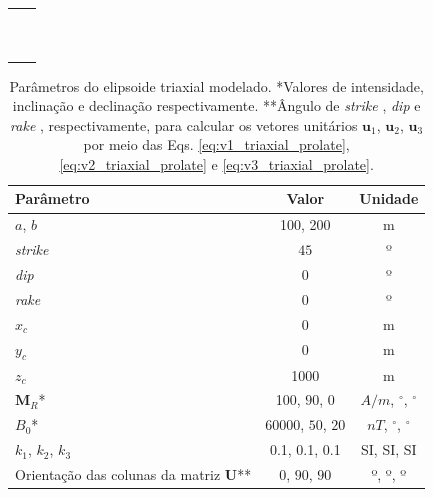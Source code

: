 \begin{table}[h!]
	\begin{center}
		\begin{tabular}{lc}
		
			 &  \\
			 & \\
			 & \\
			 & \\
			& \\
			& \\ 
			& \\
			& \\
			& \\ 
			& \\
\end{tabular}
\end{center}
\end{table}

\begin{table}[h!]
	\begin{center}
		\begin{tabular}{|l|c|c|}
			\hline
			\textbf{Parâmetro}  & \textbf{Valor} & \textbf{Unidade} \\
			\hline 
			$a$, $b$  & 100, 200 & m \\
			\hline
			\textit{strike}   & $45$ & º\\
			\hline
			\textit{dip}    & $0$ & º\\
			\hline
			\textit{rake}   & $0$  & º\\
			\hline
			$x_c $  & 0  & m\\
			\hline          
			$y_c$   & 0  & m\\
			\hline                
			$z_c$   & 1000  & m\\
			\hline
			$\mathbf{M}_{R}$*  & 100, $90$, $0$  & $A/m$, $^{\circ}$, $^{\circ}$\\
			\hline
			$B_0$*    & 60000, $50$, $20$ & $nT$, $^{\circ}$, $^{\circ}$\\
			\hline
			$k_{1}$, $k_{2}$, $k_{3}$   & 0.1, 0.1, 0.1  & SI, SI, SI\\
			\hline
			Orientação das colunas da matriz $\mathbf{U}$**   & $0$, $90$, $90$  & º, º, º\\
			\hline
		\end{tabular}
		\caption{Parâmetros do elipsoide triaxial modelado. *Valores de intensidade, inclinação e declinação respectivamente. **Ângulo de \textit{strike} , \textit{dip}  e \textit{rake} , respectivamente, para calcular os vetores unitários $\mathbf{u}_{1}$, $\mathbf{u}_{2}$, $\mathbf{u}_{3}$ por meio das Eqs. \ref{eq:v1_triaxial_prolate}, \ref{eq:v2_triaxial_prolate} e \ref{eq:v3_triaxial_prolate}.}
	\end{center}
	\label{tab:oblate}
\end{table}

